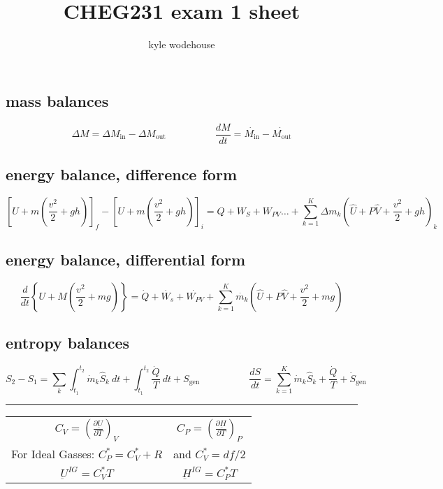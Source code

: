 \documentclass{article}
\title{\bfseries CHEG231 exam 1 sheet}
\author{kyle wodehouse}
\begin{document}
\maketitle

\subsection*{mass balances}
\[ \Delta M = \Delta M_{\text{in}} - \Delta M_{\text{out}} \hspace{5em} \frac{dM}{dt} = \dot{M_{\text{in}}} - \dot{M_{\text{out}}} \]
\subsection*{energy balance, difference form}
\[ \left[ U + m \left( \frac{v^2}{2} + gh \right) \right]_f - \left[ U + m \left( \frac{v^2}{2} + gh \right) \right]_i = Q + W_S + W_{PV} \ldots + \sum_{k=1}^{K} \Delta m_k \left( \hat{U} + P\hat{V} + \frac{v^2}{2} + gh \right)_k \]
\subsection*{energy balance, differential form}
\[ \frac{d}{dt} \left\{ U + M\left( \frac{v^2}{2} + mg\right) \right\} = \dot{Q} + \dot{W_s} + \dot{W_{PV}} + \sum_{k=1}^{K} \dot{m_k} \left( \hat{U} + P\hat{V} + \frac{v^2}{2} + mg \right) \]
\subsection*{entropy balances}
\[ S_2 - S_1 = \sum_{k} \int_{t_1}^{t_2} \dot{m}_k \hat{S}_k \ dt + \int_{t_1}^{t_2} \frac{\dot{Q}}{T} \ dt + S_{\text{gen}} \hspace{5em} \frac{dS}{dt} = \sum_{k=1}^{K} \dot{m}_k \hat{S}_k + \frac{\dot{Q}}{T} + \dot{S}_{\text{gen}} \]

\hrule


\begin{table}[H]
    \centering
    \doublespacing
    \begin{tabular}{cc}
        \( C_V = \left(\frac{\partial \underbar{U}}{\partial T}\right)_V \) & \( C_P = \left(\frac{\partial \underbar{H}}{\partial T}\right)_P \)\\
        For Ideal Gasses: $C_P^* = C_V^* + R$ & and $C_V^*  = df/2$ \\
        $\underbar{U}^{IG} = C_V^* T$ & $\underbar{H}^{IG} = C_P^* T$
    \end{tabular}
    \begin{tabular}{cc}
    \end{tabular}
\end{table}
\end{document}
